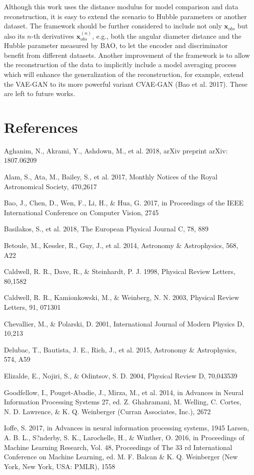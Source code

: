 \documentclass[10pt]{article}
\begin{document}
Although this work uses the distance modulus for model comparison and data reconstruction, it is easy to extend the scenario to Hubble parameters or another dataset. The framework should be further considered to include not only $\boldsymbol{x}_{o b s}$ but also its $n$-th derivatives $\boldsymbol{x}_{o b s}^{(n)}$, e.g., both the angular diameter distance and the Hubble parameter measured by BAO, to let the encoder and discriminator benefit from different datasets. Another improvement of the framework is to allow the reconstruction of the data to implicitly include a model averaging process which will enhance the generalization of the reconstruction, for example, extend the VAE-GAN to its more powerful variant CVAE-GAN (Bao et al. 2017). These are left to future works.

\section{References}
Aghanim, N., Akrami, Y., Ashdown, M., et al. 2018, arXiv preprint arXiv: $1807.06209$

Alam, S., Ata, M., Bailey, S., et al. 2017, Monthly Notices of the Royal Astronomical Society, 470,2617

Bao, J., Chen, D., Wen, F., Li, H., \& Hua, G. 2017, in Proceedings of the IEEE International Conference on Computer Vision, 2745

Basilakos, S., et al. 2018, The European Physical Journal C, 78, 889

Betoule, M., Kessler, R., Guy, J., et al. 2014, Astronomy \& Astrophysics, 568, A22

Caldwell, R. R., Dave, R., \& Steinhardt, P. J. 1998, Physical Review Letters, 80,1582

Caldwell, R. R., Kamionkowski, M., \& Weinberg, N. N. 2003, Physical Review Letters, 91, 071301

Chevallier, M., \& Polarski, D. 2001, International Journal of Modern Physics D, 10,213

Delubac, T., Bautista, J. E., Rich, J., et al. 2015, Astronomy \& Astrophysics, 574, A59

Elizalde, E., Nojiri, S., \& Odintsov, S. D. 2004, Physical Review D, 70,043539

Goodfellow, I., Pouget-Abadie, J., Mirza, M., et al. 2014, in Advances in Neural Information Processing Systems 27, ed. Z. Ghahramani, M. Welling, C. Cortes, N. D. Lawrence, \& K. Q. Weinberger (Curran Associates, Inc.), 2672

Ioffe, S. 2017, in Advances in neural information processing systems, 1945 Larsen, A. B. L., S?nderby, S. K., Larochelle, H., \& Winther, O. 2016, in Proceedings of Machine Learning Research, Vol. 48, Proceedings of The 33 rd International Conference on Machine Learning, ed. M. F. Balcan \& K. Q. Weinberger (New York, New York, USA: PMLR), 1558
\end{document}
